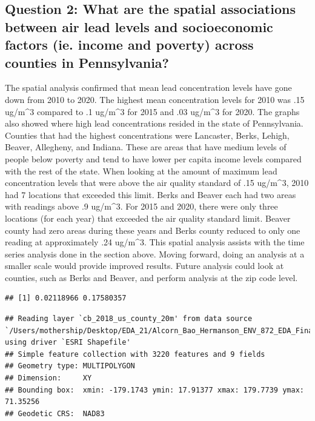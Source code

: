 \documentclass[
  12pt,
]{article}
\begin{document}
\hypertarget{question-2-what-are-the-spatial-associations-between-air-lead-levels-and-socioeconomic-factors-ie.-income-and-poverty-across-counties-in-pennsylvania-1}{%
\subsection{Question 2: What are the spatial associations between air
lead levels and socioeconomic factors (ie. income and poverty) across
counties in
Pennsylvania?}\label{question-2-what-are-the-spatial-associations-between-air-lead-levels-and-socioeconomic-factors-ie.-income-and-poverty-across-counties-in-pennsylvania-1}}

The spatial analysis confirmed that mean lead concentration levels have
gone down from 2010 to 2020. The highest mean concentration levels for
2010 was .15 ug/m\^{}3 compared to .1 ug/m\^{}3 for 2015 and .03
ug/m\^{}3 for 2020. The graphs also showed where high lead
concentrations resided in the state of Pennsylvania. Counties that had
the highest concentrations were Lancaster, Berks, Lehigh, Beaver,
Allegheny, and Indiana. These are areas that have medium levels of
people below poverty and tend to have lower per capita income levels
compared with the rest of the state. When looking at the amount of
maximum lead concentration levels that were above the air quality
standard of .15 ug/m\^{}3, 2010 had 7 locations that exceeded this
limit. Berks and Beaver each had two areas with readings above .9
ug/m\^{}3. For 2015 and 2020, there were only three locations (for each
year) that exceeded the air quality standard limit. Beaver county had
zero areas during these years and Berks county reduced to only one
reading at approximately .24 ug/m\^{}3. This spatial analysis assists
with the time series analysis done in the section above. Moving forward,
doing an analysis at a smaller scale would provide improved results.
Future analysis could look at counties, such as Berks and Beaver, and
perform analysis at the zip code level.

\begin{verbatim}
## [1] 0.02118966 0.17580357
\end{verbatim}

\begin{verbatim}
## Reading layer `cb_2018_us_county_20m' from data source `/Users/mothership/Desktop/EDA_21/Alcorn_Bao_Hermanson_ENV_872_EDA_FinalProject/Data/Spatial/cb_2018_us_county_20m.shp' using driver `ESRI Shapefile'
## Simple feature collection with 3220 features and 9 fields
## Geometry type: MULTIPOLYGON
## Dimension:     XY
## Bounding box:  xmin: -179.1743 ymin: 17.91377 xmax: 179.7739 ymax: 71.35256
## Geodetic CRS:  NAD83
\end{verbatim}
\end{document}
